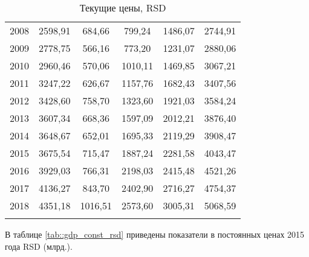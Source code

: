 \begin{longtable}{|c|c|c|c|c|c|}
	2008 & 2598,91 & 684,66  & 799,24  & 1486,07 & 2744,91 \\
	2009 & 2778,75 & 566,16  & 773,20  & 1231,07 & 2880,06 \\
	2010 & 2960,46 & 570,06  & 1010,11 & 1469,85 & 3067,21 \\
	2011 & 3247,22 & 626,67  & 1157,76 & 1682,43 & 3407,56 \\
	2012 & 3428,60 & 758,70  & 1323,60 & 1921,03 & 3584,24 \\
	2013 & 3607,34 & 668,36  & 1597,09 & 2012,21 & 3876,40 \\
	2014 & 3648,67 & 652,01  & 1695,33 & 2119,29 & 3908,47 \\
	2015 & 3675,54 & 715,47  & 1887,24 & 2281,58 & 4043,47 \\
	2016 & 3929,03 & 766,31  & 2198,03 & 2415,48 & 4521,26 \\
	2017 & 4136,27 & 843,70  & 2402,90 & 2716,27 & 4754,37 \\
	2018 & 4351,18 & 1016,51 & 2573,60 & 3005,31 & 5068,59 \\ \hline
	\caption{\label{tab::gdp_cur_rsd} Текущие цены, RSD}
\end{longtable}

В таблице \ref{tab::gdp_const_rsd} приведены показатели в постоянных ценах 2015 года RSD (млрд.).


